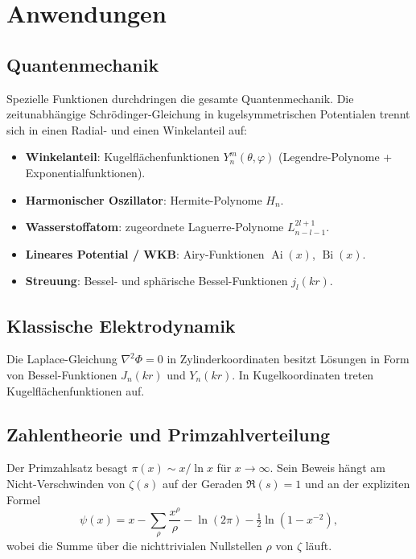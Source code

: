 \documentclass[12pt,a4paper]{amsart}
\theoremstyle{definition}
\begin{document}
\section{Anwendungen}
\label{sec:anwendungen}

\subsection{Quantenmechanik}

Spezielle Funktionen durchdringen die gesamte Quantenmechanik.
Die zeitunabhängige Schrödinger-Gleichung in kugelsymmetrischen Potentialen
trennt sich in einen Radial- und einen Winkelanteil auf:
\begin{itemize}
  \item \textbf{Winkelanteil}: Kugelflächenfunktionen \(Y_n^m(\theta,\varphi)\)
        (Legendre-Polynome + Exponentialfunktionen).
  \item \textbf{Harmonischer Oszillator}: Hermite-Polynome \(H_n\).
  \item \textbf{Wasserstoffatom}: zugeordnete Laguerre-Polynome \(L_{n-l-1}^{2l+1}\).
  \item \textbf{Lineares Potential / WKB}: Airy-Funktionen \(\operatorname{Ai}(x)\),
        \(\operatorname{Bi}(x)\).
  \item \textbf{Streuung}: Bessel- und sphärische Bessel-Funktionen \(j_l(kr)\).
\end{itemize}

\subsection{Klassische Elektrodynamik}

Die Laplace-Gleichung \(\nabla^2\Phi = 0\) in Zylinderkoordinaten besitzt Lösungen in
Form von Bessel-Funktionen \(J_n(kr)\) und \(Y_n(kr)\).  In Kugelkoordinaten treten
Kugelflächenfunktionen auf.

\subsection{Zahlentheorie und Primzahlverteilung}

Der Primzahlsatz besagt \(\pi(x) \sim x/\ln x\) für \(x \to \infty\).
Sein Beweis hängt am Nicht-Verschwinden von \(\zeta(s)\) auf der Geraden \(\Re(s) = 1\)
und an der expliziten Formel
\[
  \psi(x) = x - \sum_\rho \frac{x^\rho}{\rho} - \ln(2\pi) - \tfrac{1}{2}\ln(1-x^{-2}),
\]
wobei die Summe über die nichttrivialen Nullstellen \(\rho\) von \(\zeta\) läuft.
\end{document}
